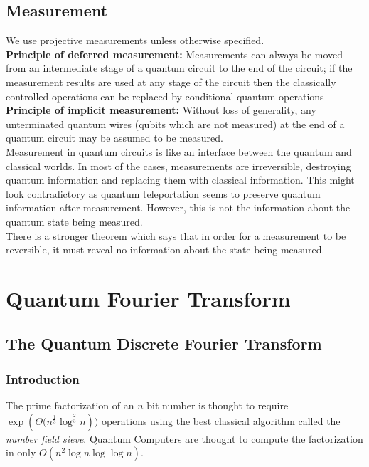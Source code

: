\documentclass{article}
\begin{document}
\subsection{Measurement}
We use projective measurements unless otherwise specified.\\[5pt]
\textbf{Principle of deferred measurement:} Measurements can always be moved from an intermediate stage of a quantum circuit to the end of the circuit; if the measurement results are used at any stage of the circuit then the classically controlled operations can be replaced by conditional quantum operations\\[5pt]
\textbf{Principle of implicit measurement:}  Without loss of generality, any unterminated quantum wires (qubits which are not measured) at the end of a quantum circuit may be assumed to be measured.\\[5pt]
Measurement in quantum circuits is like an interface between the quantum and classical worlds. In most of the cases, measurements are irreversible, destroying quantum information and replacing them with classical information. This might look contradictory as quantum teleportation seems to preserve quantum information after measurement. However, this is not the information about the quantum state being measured. \\[4pt]
There is a stronger theorem which says that in order for a measurement to be reversible, it must reveal no information about the state being measured.

\cleardoublepage
\section{Quantum Fourier Transform}
\subsection{The Quantum Discrete Fourier Transform}
\subsubsection{Introduction}
The prime factorization of an $n$ bit number is thought to require $\exp({\Theta({n^{\frac{1}{3}}\log^{\frac{2}{3}}{n}}}))$ operations using the best classical algorithm called the \emph{number field sieve}. Quantum Computers are thought to compute the factorization in only $O(n^2\log{n\log \log n})$.\\[5pt]
\end{document}

